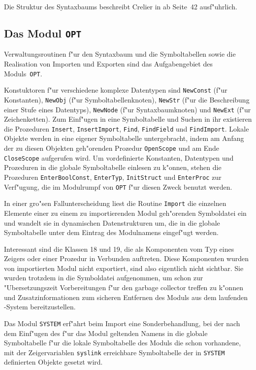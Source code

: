 \medskip
Die Struktur des Syntaxbaums beschreibt Crelier in \cite{op2doc} ab Seite~42 ausf"uhrlich.

\subsection{Das Modul {\tt OPT}}
\label{OPT}

Verwaltungsroutinen f"ur den Syntaxbaum und die Symboltabellen sowie die
Realisation von Importen und Exporten sind das Aufgabengebiet des Moduls~{\tt OPT}.

Konstuktoren f"ur verschiedene komplexe Datentypen sind {\tt NewConst} (f"ur Konstanten),
{\tt NewObj} (f"ur Symboltabellenknoten), {\tt NewStr} (f"ur die Beschreibung einer
Stufe eines Datentyps), {\tt NewNode} (f"ur Syntaxbaumknoten) und
{\tt NewExt} (f"ur Zeichenketten).
Zum Einf"ugen in eine Symboltabelle und Suchen in ihr existieren die Prozeduren
{\tt Insert}, {\tt InsertImport}, {\tt Find}, {\tt FindField} und {\tt FindImport}.
Lokale Objekte werden in eine eigener Symboltabelle untergebracht, indem am
Anfang der zu diesen Objekten geh"orenden Prozedur {\tt OpenScope} und
am Ende {\tt CloseScope} aufgerufen wird.
Um vordefinierte Konstanten, Datentypen und Prozeduren in die globale Symboltabelle
einlesen zu k"onnen, stehen die Prozeduren {\tt EnterBoolConst}, {\tt EnterTyp},
{\tt InitStruct} und {\tt EnterProc} zur Verf"ugung, die im Modulrumpf von {\tt OPT}
f"ur diesen Zweck benutzt werden.

\medskip
In einer gro"sen Fallunterscheidung liest die Routine {\tt Import} die
einzelnen Elemente einer zu einem zu importierenden Modul geh"orenden
Symboldatei ein und wandelt sie in dynamischen Datenstrukturen um,
die in die globale Symboltabelle unter dem Eintrag des Modulnamens
eingef"ugt werden.

Interessant sind die Klassen 18 und 19, die als Komponenten
vom Typ eines Zeigers oder einer Prozedur in Verbunden auftreten.
Diese Komponenten wurden von importierten Modul nicht exportiert, sind
also eigentlich nicht sichtbar.
Sie wurden trotzdem in die Symboldatei aufgenommen, um schon zur
"Ubersetzungszeit Vorbereitungen f"ur den garbage collector treffen zu k"onnen
und Zusatzinformationen zum sicheren Entfernen des Moduls aus dem
laufenden \oberon-System bereitzustellen.

Das Modul {\tt SYSTEM} erf"ahrt beim Import eine Sonderbehandlung, bei der
nach dem Einf"ugen des f"ur das Modul geltenden Namens in die globale
Symboltabelle f"ur die lokale Symboltabelle des Moduls die schon vorhandene,
mit der Zeigervariablen {\tt syslink} erreichbare Symboltabelle der in
{\tt SYSTEM} definierten Objekte gesetzt wird.

